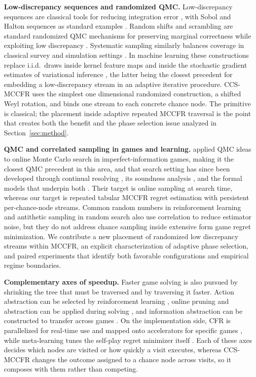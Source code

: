 \documentclass[11pt]{article}
\begin{document}
\textbf{Low-discrepancy sequences and randomized QMC.} Low-discrepancy sequences are classical tools for reducing integration error \citep{niederreiter1992random}, with Sobol and Halton sequences as standard examples \citep{sobol1967distribution,halton1960efficiency}. Random shifts and scrambling are standard randomized QMC mechanisms for preserving marginal correctness while exploiting low discrepancy \citep{cranley1976randomization,owen1997monte}. Systematic sampling similarly balances coverage in classical survey and simulation settings \citep{madow1944theory}. In machine learning these constructions replace i.i.d.\ draws inside kernel feature maps \citep{avron2016quasi} and inside the stochastic gradient estimates of variational inference \citep{buchholz2018quasi}, the latter being the closest precedent for embedding a low-discrepancy stream in an adaptive iterative procedure. CCS-MCCFR uses the simplest one dimensional randomized construction, a shifted Weyl rotation, and binds one stream to each concrete chance node. The primitive is classical; the placement inside adaptive repeated MCCFR traversal is the point that creates both the benefit and the phase selection issue analyzed in Section~\ref{sec:method}.

\textbf{QMC and correlated sampling in games and learning.} \citet{lisy2015online} applied QMC ideas to online Monte Carlo search in imperfect-information games, making it the closest QMC precedent in this area, and that search setting has since been developed through continual resolving \citep{sustr2019monte}, its soundness analysis \citep{sustr2020sound}, and the formal models that underpin both \citep{kovarik2022rethinking}. Their target is online sampling at search time, whereas our target is repeated tabular MCCFR regret estimation with persistent per-chance-node streams. Common random numbers in reinforcement learning \citep{peshkin2002learning} and antithetic sampling in random search \citep{mania2018simple} also use correlation to reduce estimator noise, but they do not address chance sampling inside extensive form game regret minimization. We contribute a new placement of randomized low discrepancy streams within MCCFR, an explicit characterization of adaptive phase selection, and paired experiments that identify both favorable configurations and empirical regime boundaries.

\textbf{Complementary axes of speedup.} Faster game solving is also pursued by shrinking the tree that must be traversed and by traversing it faster. Action abstraction can be selected by reinforcement learning \citep{li2024rl}, online pruning and abstraction can be applied during solving \citep{li2025efficient}, and information abstraction can be constructed to transfer across games \citep{li2026effective}. On the implementation side, CFR is parallelized for real-time use \citep{li2026parallel} and mapped onto accelerators for specific games \citep{baghal2025pasur}, while meta-learning tunes the self-play regret minimizer itself \citep{sychrovsky2025meta}. Each of these axes decides which nodes are visited or how quickly a visit executes, whereas CCS-MCCFR changes the outcome assigned to a chance node across visits, so it composes with them rather than competing.
\end{document}
